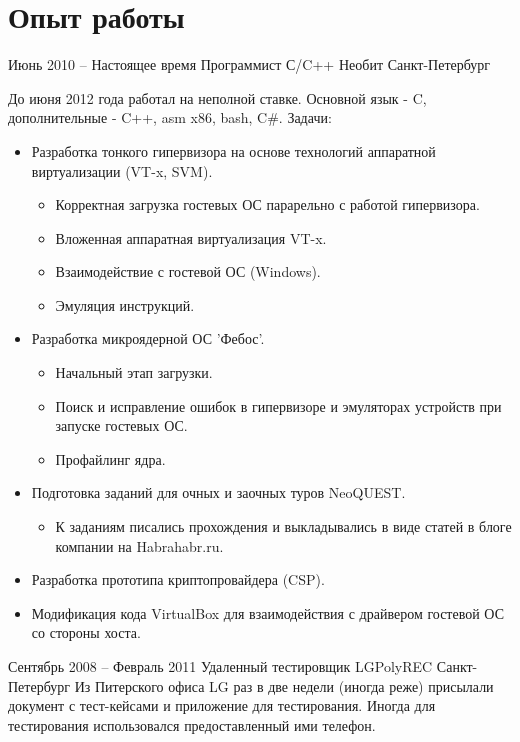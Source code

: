 \documentclass[11pt,a4paper,sans]{moderncv}
\begin{document}
\section{Опыт работы}
    \cventry
        {Июнь 2010 -- Настоящее время}
        {Программист С/C++}
        {Необит}
        {Санкт-Петербург}
        {}
        {До июня 2012 года работал на неполной ставке.
        \newline Основной язык - C, дополнительные - C++, asm x86, bash, C\#.\newline{}%
            Задачи:%
            \begin{itemize}%
            \item Разработка тонкого гипервизора на основе технологий
                аппаратной виртуализации (VT-x, SVM).
                \begin{itemize}
                \item Корректная загрузка гостевых ОС парарельно с работой
                    гипервизора.
                \item Вложенная аппаратная виртуализация VT-x.
                \item Взаимодействие с гостевой ОС (Windows).
                \item Эмуляция инструкций.
                \end{itemize}
            \item Разработка микроядерной ОС 'Фебос'.
                \begin{itemize}%
                \item Начальный этап загрузки.
                \item Поиск и исправление ошибок в гипервизоре и эмуляторах
                    устройств при запуске гостевых ОС.
                \item Профайлинг ядра.
                \end{itemize}
            \item Подготовка заданий для очных и заочных туров NeoQUEST.
                \begin{itemize}%
                \item К заданиям писались прохождения и выкладывались в виде
                    статей в блоге компании на Habrahabr.ru.
                \end{itemize}
            \item Разработка прототипа криптопровайдера (CSP).
            \item Модификация кода VirtualBox для взаимодействия с драйвером
                гостевой ОС со стороны хоста.
            \end{itemize}
        }
    \cventry
        {Сентябрь 2008 -- Февраль 2011}
        {Удаленный тестировщик}
        {LGPolyREC}
        {Санкт-Петербург}
        {}
        {Из Питерского офиса LG раз в две недели (иногда реже) присылали
        документ с тест-кейсами и приложение для тестирования. Иногда для
        тестирования использовался предоставленный ими телефон.}
\end{document}
